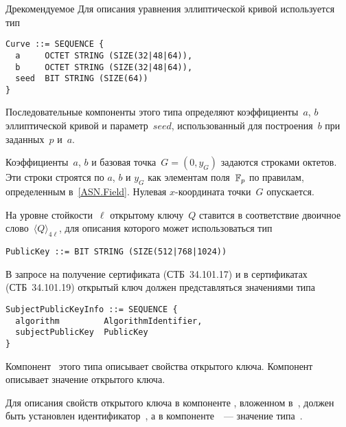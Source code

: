 \begin{appendix}{Д}{рекомендуемое}
Для описания уравнения эллиптической кривой используется тип
\begin{verbatim}
Curve ::= SEQUENCE {
  a     OCTET STRING (SIZE(32|48|64)),
  b     OCTET STRING (SIZE(32|48|64)),
  seed  BIT STRING (SIZE(64))
}
\end{verbatim}

Последовательные компоненты этого типа определяют 
коэффициенты~$a$, $b$ эллиптической кривой и параметр~$seed$,
использованный для построения~$b$ при заданных~$p$ и~$a$.

Коэффициенты~$a$, $b$ и базовая точка~$G=(0,y_G)$ 
задаются строками октетов.
%
Эти строки строятся по $a$, $b$ и $y_G$ как элементам поля~$\mathbb{F}_p$
по правилам, определенным в~\ref{ASN.Field}. 
Нулевая $x$-координата точки~$G$ опускается.

\label{ASN.PubKey}

На уровне стойкости~$\ell$ открытому ключу~$Q$ 
ставится в соответствие двоичное слово~$\langle Q\rangle_{4\ell}$,
для описания которого может использоваться тип
\begin{verbatim}
PublicKey ::= BIT STRING (SIZE(512|768|1024))
\end{verbatim}

В запросе на получение сертификата (СТБ~34.101.17) 
и в сертификатах (СТБ~34.101.19)
открытый ключ должен представляться значениями типа
\begin{verbatim}
SubjectPublicKeyInfo ::= SEQUENCE {
  algorithm         AlgorithmIdentifier,
  subjectPublicKey  PublicKey
}
\end{verbatim}

Компонент~ этого типа 
описывает свойства открытого ключа.
Компонент~ 
описывает значение открытого ключа.

Для описания свойств открытого ключа в компоненте
, вложенном в~,
должен быть установлен идентификатор~,
а в компоненте~~--- значение 
типа~.

%
%
%


\end{appendix}
